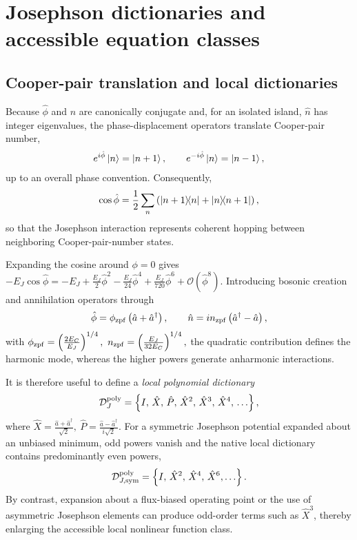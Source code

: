 \documentclass[pra,twocolumn,superscriptaddress,nofootinbib,floatfix]{revtex4-2}
\theoremstyle{remark}
\begin{document}


\clearpage
\appendix

\section{Josephson dictionaries and accessible equation classes}
\label{app:equation-classes}

\subsection{Cooper-pair translation and local dictionaries}

Because \(\hat\phi\) and \(\hat n\) are canonically conjugate and, for an isolated island, \(\hat n\) has integer eigenvalues, the phase-displacement operators translate Cooper-pair number,
\begin{align}
e^{i\hat\phi}\ket{n}=\ket{n+1},\qquad e^{-i\hat\phi}\ket{n}=\ket{n-1},
\end{align}
up to an overall phase convention. Consequently,
\begin{align}
\cos\hat\phi=\frac{1}{2}\sum_{n}\left(\ketbra{n+1}{n}+\ketbra{n}{n+1}\right),
\end{align}
so that the Josephson interaction represents coherent hopping between neighboring Cooper-pair-number states.

Expanding the cosine around \(\phi=0\) gives
\(-E_J\cos\hat\phi=-E_J+\frac{E_J}{2}\hat\phi^2-\frac{E_J}{24}\hat\phi^4+\frac{E_J}{720}\hat\phi^6+\mathcal O(\hat\phi^8).\)
Introducing bosonic creation and annihilation operators through
\begin{align}
\hat\phi=\phi_{\rm zpf}\left(\hat a+\hat a^\dagger\right),\qquad \hat n=i n_{\rm zpf}\left(\hat a^\dagger-\hat a\right),
\end{align}
with
$\phi_{\rm zpf}=\left(\frac{2E_C}{E_J}\right)^{1/4},\ n_{\rm zpf}=\left(\frac{E_J}{32E_C}\right)^{1/4},$
the quadratic contribution defines the harmonic mode, whereas the higher powers generate anharmonic interactions.

It is therefore useful to define a \emph{local polynomial dictionary}
\begin{align}
\mathcal D_{J}^{\rm poly}=\left\{I,\,\hat X,\,\hat P,\,\hat X^2,\,\hat X^3,\,\hat X^4,\,\ldots\right\},
\label{eq:polynomial-dictionary}
\end{align}
where
\(\hat X=\frac{\hat a+\hat a^\dagger}{\sqrt{2}},\ \hat P=\frac{\hat a-\hat a^\dagger}{i\sqrt{2}}.\)
For a symmetric Josephson potential expanded about an unbiased minimum, odd powers vanish and the native local dictionary contains predominantly even powers,
\begin{align}
\mathcal D_{J,{\rm sym}}^{\rm poly}=\left\{I,\,\hat X^2,\,\hat X^4,\,\hat X^6,\ldots\right\}.
\end{align}
By contrast, expansion about a flux-biased operating point or the use of asymmetric Josephson elements can produce odd-order terms such as \(\hat X^3\), thereby enlarging the accessible local nonlinear function class.
\end{document}
